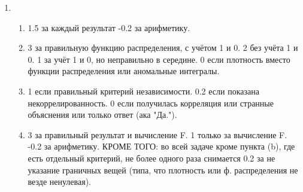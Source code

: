 \documentclass[12pt]{article}
\begin{document}
\begin{enumerate}
    \item 
    \begin{enumerate}
    \item  1.5 за каждый результат -0.2 за арифметику.
    \item  3 за правильную функцию распределения, с учётом 1 и 0.
    2 без учёта 1 и 0.
    1 за учёт 1 и 0, но неправильно в середине.
    0 если плотность вместо функции распределения или аномальные интегралы.
    \item 1 если правильный критерий независимости.
    0.2 если показана некоррелированность.
    0 если получилась корреляция или странные объяснения или только ответ (ака "Да.").
    \item 3 за правильный результат и вычисление F.
    1 только за вычисление F.
    -0.2 за арифметику.
    КРОМЕ ТОГО: во всей задаче кроме пункта (b), где есть отдельный критерий, не более одного раза снимается 0.2 за не указание граничных вещей (типа, что плотность или ф. распределения не везде ненулевая).
    \end{enumerate}

\end{enumerate}
\end{document}

